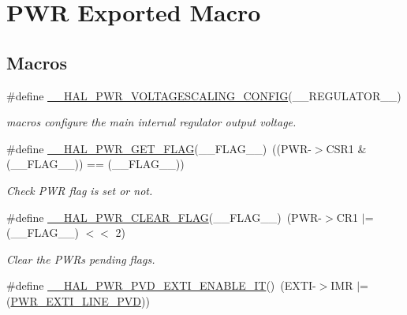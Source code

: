 \hypertarget{group___p_w_r___exported___macro}{}\section{P\+WR Exported Macro}
\label{group___p_w_r___exported___macro}
\subsection*{Macros}
\begin{DoxyCompactItemize}
\item 
\#define \mbox{\hyperlink{group___p_w_r___exported___macro_ga1ee778f7ff494723bd0ef04ec44b0f77}{\+\_\+\+\_\+\+H\+A\+L\+\_\+\+P\+W\+R\+\_\+\+V\+O\+L\+T\+A\+G\+E\+S\+C\+A\+L\+I\+N\+G\+\_\+\+C\+O\+N\+F\+IG}}(\+\_\+\+\_\+\+R\+E\+G\+U\+L\+A\+T\+O\+R\+\_\+\+\_\+)
\begin{DoxyCompactList}\small\item\em macros configure the main internal regulator output voltage. \end{DoxyCompactList}\item 
\#define \mbox{\hyperlink{group___p_w_r___exported___macro_ga2977135bbea35b786805eea640d1c884}{\+\_\+\+\_\+\+H\+A\+L\+\_\+\+P\+W\+R\+\_\+\+G\+E\+T\+\_\+\+F\+L\+AG}}(\+\_\+\+\_\+\+F\+L\+A\+G\+\_\+\+\_\+)~((P\+WR-\/$>$C\+S\+R1 \& (\+\_\+\+\_\+\+F\+L\+A\+G\+\_\+\+\_\+)) == (\+\_\+\+\_\+\+F\+L\+A\+G\+\_\+\+\_\+))
\begin{DoxyCompactList}\small\item\em Check P\+WR flag is set or not. \end{DoxyCompactList}\item 
\#define \mbox{\hyperlink{group___p_w_r___exported___macro_ga96f24bf4b16c9f944cd829100bf746e5}{\+\_\+\+\_\+\+H\+A\+L\+\_\+\+P\+W\+R\+\_\+\+C\+L\+E\+A\+R\+\_\+\+F\+L\+AG}}(\+\_\+\+\_\+\+F\+L\+A\+G\+\_\+\+\_\+)~(P\+WR-\/$>$C\+R1 $\vert$=  (\+\_\+\+\_\+\+F\+L\+A\+G\+\_\+\+\_\+) $<$$<$ 2)
\begin{DoxyCompactList}\small\item\em Clear the P\+WR\textquotesingle{}s pending flags. \end{DoxyCompactList}\item 
\#define \mbox{\hyperlink{group___p_w_r___exported___macro_ga3180f039cf14ef78a64089f387f8f9c2}{\+\_\+\+\_\+\+H\+A\+L\+\_\+\+P\+W\+R\+\_\+\+P\+V\+D\+\_\+\+E\+X\+T\+I\+\_\+\+E\+N\+A\+B\+L\+E\+\_\+\+IT}}()~(E\+X\+TI-\/$>$I\+MR $\vert$= (\mbox{\hyperlink{group___p_w_r___p_v_d___e_x_t_i___line_ga43a49255649e03d2d2b6b12c5c379d2b}{P\+W\+R\+\_\+\+E\+X\+T\+I\+\_\+\+L\+I\+N\+E\+\_\+\+P\+VD}}))
$$
\end{DoxyCompactItemize}
